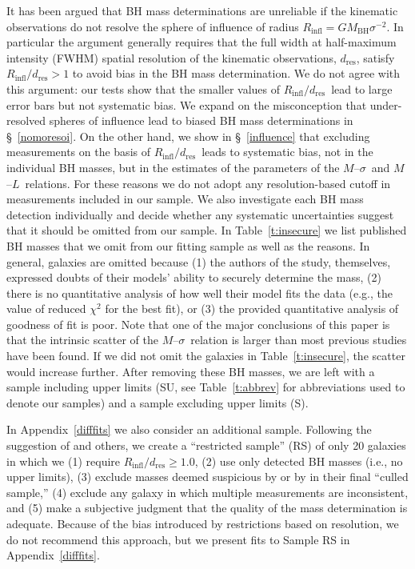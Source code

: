 \documentclass[twosided,letterpaper,numberedappendix]{emulateapj}
\newcommand{\msigma}   {\ensuremath{M}{--}\ensuremath{\sigma}}
\newcommand{\ml}       {\ensuremath{M}{--}\ensuremath{L}}
\newcommand{\mbh}      {\ensuremath{M_{\mathrm{BH}}}}
\newcommand{\rinfres} {\ensuremath{R_{\mathrm{infl}} / d_{\mathrm{res}}}}
\begin{document}
It has been argued \citep[e.g.,][]{ff05} that BH mass determinations
are unreliable if the kinematic observations do not resolve the sphere
of influence of radius $R_{\mathrm{infl}} = G \mbh \sigma^{-2}$.  In
particular the argument generally requires that the full width at
half-maximum intensity (FWHM) spatial resolution of the kinematic
observations, $d_{\mathrm{res}}$, satisfy $R_{\mathrm{infl}} /
d_{\mathrm{res}} > 1$ to avoid bias in the BH mass determination.
We do not agree with this argument: our tests
\citep{2003ApJ...583...92G,kormendy04} show that the smaller values of
\rinfres\ lead to large error bars but not systematic bias.  We expand
on the misconception that under-resolved spheres of influence lead to
biased BH mass determinations in \S~\ref{nomoresoi}.  On the other
hand, we show in \S~\ref{influence} that excluding measurements on the
basis of \rinfres\ leads to systematic bias, not in the individual BH
masses, but in the estimates of the parameters of the \msigma\ and
\ml\ relations.  For these reasons we do not adopt any
resolution-based cutoff in measurements included in our sample.  We
also investigate each BH mass detection individually and decide
whether any systematic uncertainties suggest that it should be omitted
from our sample.  In Table~\ref{t:insecure} we list published BH
masses that we omit from our fitting sample as well as the reasons.
In general, galaxies are omitted because 
%
(1) the authors of the study, themselves, expressed doubts of their
models' ability to securely determine the mass,
%
(2) there is no quantitative analysis of how well their model fits the
data (e.g., the value of reduced $\chi^2$ for the best fit), or
%
(3) the provided quantitative analysis of goodness of fit is poor.
%
Note that one of the major conclusions of this paper is that the
intrinsic scatter of the \msigma\ relation is larger than most
previous studies have been found.  If we did not omit the galaxies in
Table~\ref{t:insecure}, the scatter would increase further.
%
After removing these BH masses, we are left with a sample including
upper limits (SU, see Table~\ref{t:abbrev} for abbreviations used to
denote our samples) and a sample excluding upper limits (S).

In Appendix~\ref{difffits} we also consider an additional sample.
Following the suggestion of \citet{ff05} and others, we create a
``restricted sample'' (RS) of only 20 galaxies in which we (1) require
$\rinfres \ge 1.0$, (2) use only detected BH masses (i.e., no upper
limits), (3) exclude masses deemed suspicious by \citet{ff05} or by
\citet{tremaineetal02} in their final ``culled sample,'' (4) exclude
any galaxy in which multiple measurements are inconsistent, and (5)
make a subjective judgment that the quality of the mass determination
is adequate.  Because of the bias introduced by restrictions based on
resolution, we do not recommend this approach, but we present fits to
Sample RS in Appendix~\ref{difffits}.
\end{document}
